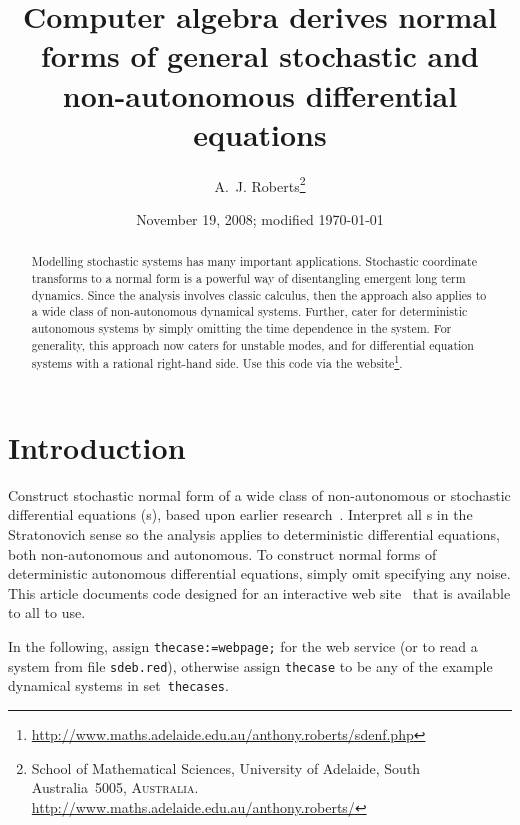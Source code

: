 \documentclass[11pt,a5paper]{article}
\title{Computer algebra derives normal forms of general stochastic and non-autonomous differential equations}
\author{A.~J. Roberts\thanks{School of Mathematical Sciences, University of Adelaide, South Australia~5005, \textsc{Australia}.
\url{http://www.maths.adelaide.edu.au/anthony.roberts/}}}
\date{November 19, 2008; modified \today}
\begin{document}
\maketitle


\begin{abstract}
Modelling stochastic systems has many important applications.
Stochastic coordinate transforms to a normal form is a powerful way of disentangling emergent long term dynamics.
Since the analysis involves classic calculus, then the approach also applies to a wide class of non-autonomous dynamical systems.
Further, cater for deterministic autonomous systems by simply omitting the time dependence in the system.
For generality, this approach now caters for unstable modes, and for differential equation systems with a rational right-hand side.
Use this code via the website\footnote{\url{http://www.maths.adelaide.edu.au/anthony.roberts/sdenf.php}}.
\end{abstract}

\tableofcontents

\section{Introduction}

Construct stochastic normal form of a wide class of non-autonomous or stochastic differential equations (\sde{}s), based upon earlier research~\cite[]{Cox91, Chao95, Roberts06k}.
Interpret all \sde{}s in the Stratonovich sense so the analysis applies to deterministic differential equations, both non-autonomous and autonomous.
To construct normal forms of deterministic autonomous differential equations, simply omit specifying any noise.
This article documents code designed for an interactive web site~\cite[]{Roberts09c} that is available to all to use.


In the following, assign \verb|thecase:=webpage;| for the web service (or to read a system from file \verb|sdeb.red|), otherwise assign \verb|thecase| to be any of the example dynamical systems in set~\verb|thecases|.
\end{document}
